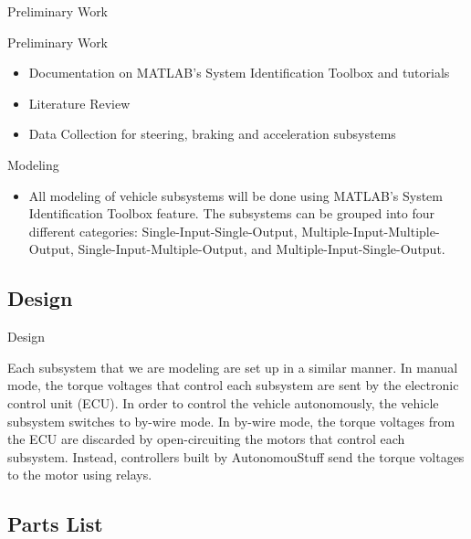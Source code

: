 \documentclass{beamer}
\begin{document}
\begin{frame}{Preliminary Work}
  \begin{block}{Preliminary Work}
 \begin{itemize}
        \item Documentation on MATLAB's System Identification Toolbox and tutorials
        \item Literature Review 
        \item Data Collection for steering, braking and acceleration subsystems
\end{itemize}
  \end{block}
  \begin {block}{Modeling}
  \begin{itemize}
  	\item All modeling of vehicle subsystems will be done using MATLAB's System Identification Toolbox feature. The subsystems can be grouped into four different categories: Single-Input-Single-Output, Multiple-Input-Multiple-Output, Single-Input-Multiple-Output, and Multiple-Input-Single-Output. 
  	\end{itemize}
  	\end{block}
\end{frame}

\subsection{Design}

\begin{frame}{Design}
	\begin{block}{}
		Each subsystem that we are modeling are set up in a similar manner. In manual mode, the torque voltages that control each subsystem are sent by the electronic control unit (ECU). In order to control the vehicle autonomously, the vehicle subsystem switches to by-wire mode. In by-wire mode, the torque voltages from the ECU are discarded by open-circuiting the motors that control each subsystem. Instead, controllers built by AutonomouStuff send the torque voltages to the motor using relays.
	\end{block}
\end{frame}

\subsection{Parts List}
\end{document}
